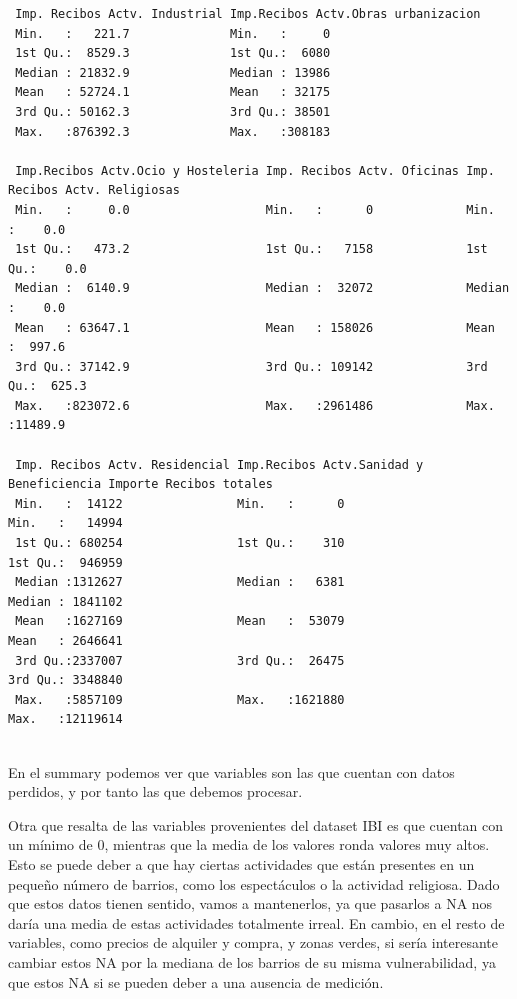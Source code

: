 \documentclass[notspecified,article,submit,moreauthors,pdftex]{Definitions/mdpi}
\begin{document}
\begin{verbatim}
 Imp. Recibos Actv. Industrial Imp.Recibos Actv.Obras urbanizacion
 Min.   :   221.7              Min.   :     0                     
 1st Qu.:  8529.3              1st Qu.:  6080                     
 Median : 21832.9              Median : 13986                     
 Mean   : 52724.1              Mean   : 32175                     
 3rd Qu.: 50162.3              3rd Qu.: 38501                     
 Max.   :876392.3              Max.   :308183                     
                                                                  
 Imp.Recibos Actv.Ocio y Hosteleria Imp. Recibos Actv. Oficinas Imp. Recibos Actv. Religiosas
 Min.   :     0.0                   Min.   :      0             Min.   :    0.0              
 1st Qu.:   473.2                   1st Qu.:   7158             1st Qu.:    0.0              
 Median :  6140.9                   Median :  32072             Median :    0.0              
 Mean   : 63647.1                   Mean   : 158026             Mean   :  997.6              
 3rd Qu.: 37142.9                   3rd Qu.: 109142             3rd Qu.:  625.3              
 Max.   :823072.6                   Max.   :2961486             Max.   :11489.9              
                                                                                             
 Imp. Recibos Actv. Residencial Imp.Recibos Actv.Sanidad y Beneficiencia Importe Recibos totales
 Min.   :  14122                Min.   :      0                          Min.   :   14994       
 1st Qu.: 680254                1st Qu.:    310                          1st Qu.:  946959       
 Median :1312627                Median :   6381                          Median : 1841102       
 Mean   :1627169                Mean   :  53079                          Mean   : 2646641       
 3rd Qu.:2337007                3rd Qu.:  26475                          3rd Qu.: 3348840       
 Max.   :5857109                Max.   :1621880                          Max.   :12119614       
                                                                                                
\end{verbatim}

En el summary podemos ver que variables son las que cuentan con datos
perdidos, y por tanto las que debemos procesar.

Otra que resalta de las variables provenientes del dataset IBI es que
cuentan con un mínimo de 0, mientras que la media de los valores ronda
valores muy altos. Esto se puede deber a que hay ciertas actividades que
están presentes en un pequeño número de barrios, como los espectáculos o
la actividad religiosa. Dado que estos datos tienen sentido, vamos a
mantenerlos, ya que pasarlos a NA nos daría una media de estas
actividades totalmente irreal. En cambio, en el resto de variables, como
precios de alquiler y compra, y zonas verdes, si sería interesante
cambiar estos NA por la mediana de los barrios de su misma
vulnerabilidad, ya que estos NA si se pueden deber a una ausencia de
medición.
\end{document}
